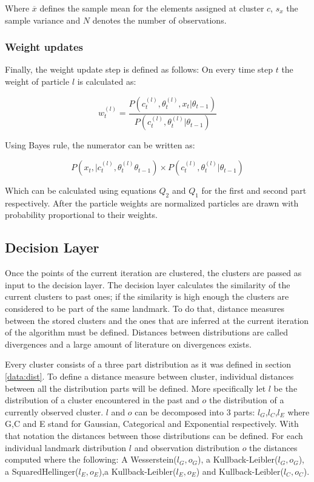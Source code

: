 \documentclass[twoside,hidelinks]{article}
\begin{document}
Where $\overline{x}$ defines the sample mean for the elements assigned at cluster $c$, $s_{x}$ the sample variance and $N$ denotes the number of observations\cite{conjugate}.

\subsubsection{Weight updates}

Finally, the weight update step is defined as follows: On every time step $t$ the weight of particle $l$ is calculated as:

\begin{equation}
w_t^{(l)} = \frac {P(c_t^{(l)} , \theta_t^{(l)}, x_t| 	\theta_{t-1} )}{P(c_t^{(l)} , \theta_t^{(l)}| 	\theta_{t-1} )}
\end{equation}

Using Bayes rule, the numerator can be written as:

\begin{equation}
	P(x_t , | c_t^{(l)} , \theta_t^{(l)} \theta_{t-1} ) \times P(c_t^{(l)} , \theta_t^{(l)}|  \theta_{t-1} )
\end{equation}

Which can be calculated using equations $Q_2$ and $Q_1$ for the first and second part respectively. After the particle weights are normalized particles are drawn with probability proportional to their weights.

\subsection{Decision Layer}

Once the points of the current iteration are clustered, the clusters are passed as input to the decision layer. The decision layer calculates the similarity of the current clusters to past ones; if the similarity is high enough the clusters are considered to be part of the same landmark. To do that, distance measures between the stored clusters and the ones that are inferred at the current iteration of the algorithm must be defined. Distances between distributions are called divergences and a large amount of literature on divergences exists.

Every cluster consists of a three part distribution as it was defined in section \ref{data:dist}. To define a distance measure between cluster, individual distances between all the distribution parts will be defined. More specifically let $l$ be the distribution of a cluster encountered in the past and $o$ the distribution of a currently observed cluster. $l$ and $o$ can be decomposed into 3 parts: $l_G$,$l_C$,$l_E$ where G,C and E stand for Gaussian, Categorical and Exponential respectively. With that notation the distances between those distributions can be defined. For each individual landmark distribution $l$ and observation distribution $o$ the distances computed where the following: A Wesserstein($l_G,o_G$), a Kullback-Leibler($l_G,o_G$), a SquaredHellinger($l_E,o_E$),a Kullback-Leibler($l_E,o_E$) and  Kullback-Leibler($l_C,o_C$).
\end{document}
